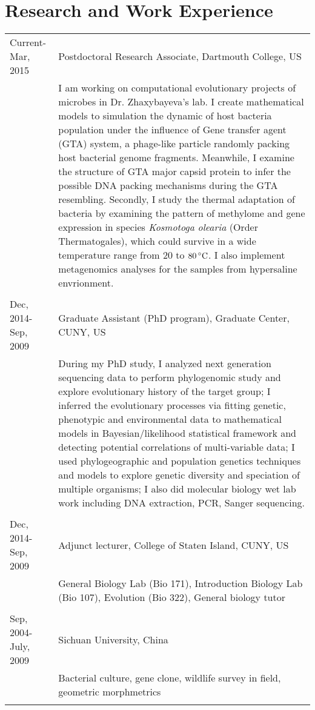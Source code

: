 \documentclass[12pt]{article}
\begin{document}
\section{Research and Work Experience}
\begin{tabular}{lp{12cm}}
Current-Mar, 2015 & Postdoctoral Research Associate, Dartmouth College, US \\&\footnotesize{I am working on computational evolutionary projects of microbes in Dr. Zhaxybayeva's lab. I create mathematical models to simulation the dynamic of host bacteria population under the influence of Gene transfer agent (GTA) system, a phage-like particle randomly packing host bacterial genome fragments. Meanwhile, I examine the structure of GTA major capsid protein to infer the possible DNA packing mechanisms during the GTA resembling. Secondly, I study the thermal adaptation of bacteria by examining the pattern of methylome and gene expression in species \textit{Kosmotoga olearia} (Order Thermatogales), which could survive in a wide temperature range from 20 to $80\,^{\circ}{\rm C}$. I also implement metagenomics analyses for the samples from hypersaline envrionment.}\\\multicolumn{2}{c}{} \\
Dec, 2014-Sep, 2009& Graduate Assistant (PhD program), Graduate Center, CUNY, US\\&\footnotesize{During my PhD study, I analyzed next generation sequencing data to perform phylogenomic study and explore evolutionary history of the target group; I inferred the evolutionary processes via fitting genetic, phenotypic and environmental data to mathematical models in Bayesian/likelihood statistical framework and detecting potential correlations of multi-variable data; I used phylogeographic and population genetics techniques and models to explore genetic diversity and speciation of multiple organisms; I also did molecular biology wet lab work including DNA extraction, PCR, Sanger sequencing.}\\\multicolumn{2}{c}{} \\
Dec, 2014-Sep, 2009&Adjunct lecturer, College of Staten Island, CUNY, US\\&\footnotesize{General Biology Lab (Bio 171), Introduction Biology Lab (Bio 107), Evolution (Bio 322), General biology tutor}\\ 
\multicolumn{2}{c}{} \\
Sep, 2004-July, 2009&Sichuan University, China\\&\footnotesize{Bacterial culture, gene clone, wildlife survey in field, geometric morphmetrics}\\ 
\multicolumn{2}{c}{} \\
\end{tabular}
\end{document}
